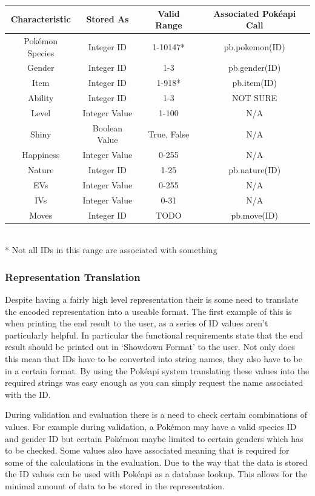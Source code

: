 \documentclass[a4paper]{article}
\newcommand{\Pokemon}{Pok\'{e}mon}
\newcommand{\Pokeapi}{Pok\'{e}api}
\begin{document}
\begin{center}
    \begin{tabular}{ c | c c c }
        Characteristic & Stored As & Valid Range & Associated \Pokeapi{} Call \\
        \hline
        \Pokemon{} Species & Integer ID & 1-10147* & pb.pokemon(ID) \\
		Gender & Integer ID & 1-3 & pb.gender(ID) \\
		Item & Integer ID & 1-918* & pb.item(ID) \\
		Ability & Integer ID & 1-3 & NOT SURE \\
		Level & Integer Value & 1-100 & N/A \\
		Shiny & Boolean Value & {True, False} & N/A \\
		Happiness & Integer Value & 0-255 & N/A \\
		Nature & Integer ID & 1-25 & pb.nature(ID) \\
		EVs & Integer Value & 0-255 & N/A \\
		IVs & Integer Value & 0-31 & N/A \\
		Moves & Integer ID & TODO & pb.move(ID) \\
    \end{tabular} \\
	\** Not all IDs in this range are associated with something
\end{center}
\subsubsection{Representation Translation}
\par
Despite having a fairly high level representation their is some need to translate the encoded representation into a useable format.
The first example of this is when printing the end result to the user, as a series of ID values aren't particularly helpful.
In particular the functional requirements state that the end result should be printed out in `Showdown Format' to the user.
Not only does this mean that IDs have to be converted into string names, they also have to be in a certain format.
By using the \Pokeapi{} system translating these values into the required strings was easy enough as you can simply request the name associated with the ID\@.
\par
During validation and evaluation there is a need to check certain combinations of values.
For example during validation, a \Pokemon{} may have a valid species ID and gender ID but certain \Pokemon{} maybe limited to certain genders which has to be checked.
Some values also have associated meaning that is required for some of the calculations in the evaluation. Due to the way that the data is stored the ID values can be used with \Pokeapi{} as a database lookup.
This allows for the minimal amount of data to be stored in the representation.
\end{document}
